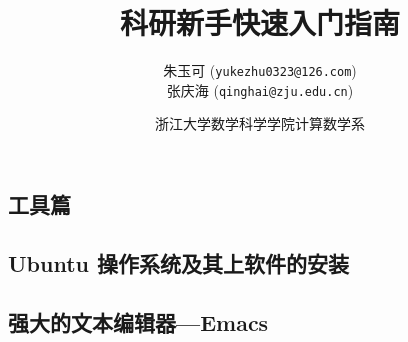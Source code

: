 \documentclass[a4paper,oneside]{report}
\begin{document}
\begin{CJK*}{UTF8}{gkai}
\CJKindent
\makeatletter %
\def\@cite#1#2{\textsuperscript{[{#1\if@tempswa , #2\fi}]}}
\makeatother
\newtheorem{theorem}{{定理}}
\newtheorem{remark}{{注}}
\newtheorem{proposition}[theorem]{{命题}}
\newtheorem{lemma}[theorem]{{引理}}
\newtheorem{corollary}[theorem]{{推论}}
\newtheorem{definition}[theorem]{{定义}}
\newtheorem{question}[theorem]{{问题}}

\renewcommand{\bibname}{\centerline{参考文献}}
\renewcommand{\tablename}{表}
\renewcommand{\figurename}{图}

		
\title{科研新手快速入门指南}
\author{朱玉可 (\texttt{yukezhu0323@126.com})\\
  张庆海 (\texttt{qinghai@zju.edu.cn})\\
}
\date{浙江大学数学科学学院计算数学系}


\maketitle

%

\pagestyle{empty}

\tableofcontents
\clearpage

\pagestyle{fancy}
\fancyhead{}
\chead{}


\chapter{工具篇}

\section{Ubuntu 操作系统及其上软件的安装}
\label{sec:ubuntu}


\section{强大的文本编辑器---Emacs}
\label{sec:emacs}



\end{CJK*}
\end{document}
